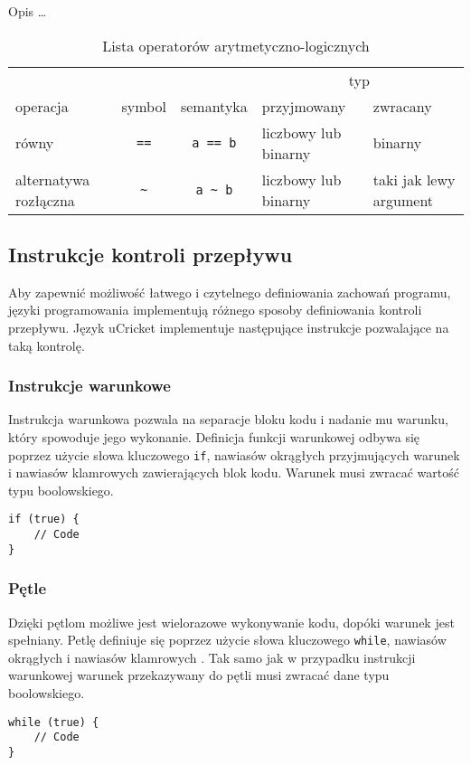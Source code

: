 \begin{table}%
\centering
\caption{Opis …}
\label{tbl:etykieta}
\begin{tabular}{lccp{2.8cm}p{3cm}}
\toprule
         &          &           & \multicolumn{2}{c}{typ} \\
\cmidrule{4-5}
operacja & symbol & semantyka & przyjmowany & zwracany \\ 
\midrule
równy & \lstinline|==|& \lstinline|a == b| & liczbowy lub binarny & binarny\\
alternatywa rozłączna & \lstinline|~| & \lstinline|a ~ b| & liczbowy lub binarny & taki jak lewy argument\\
\bottomrule
\end{tabular}
\caption{Lista operatorów arytmetyczno-logicznych}
\label{tbl:operatory-arytmetyczno-logiczne}
\end{table}


\subsection{Instrukcje kontroli przepływu}
Aby zapewnić możliwość łatwego i czytelnego definiowania zachowań programu, języki programowania implementują różnego sposoby definiowania kontroli przepływu. Język uCricket implementuje następujące instrukcje pozwalające na taką kontrolę.

\subsubsection{Instrukcje warunkowe}
Instrukcja warunkowa pozwala na separacje bloku kodu i nadanie mu warunku, który spowoduje jego wykonanie. Definicja funkcji warunkowej odbywa się poprzez użycie słowa kluczowego \lstinline|if|, nawiasów okrągłych przyjmujących warunek i nawiasów klamrowych zawierających blok kodu. Warunek musi zwracać wartość typu boolowskiego. 
\begin{lstlisting}
if (true) {
	// Code
}
\end{lstlisting}

\subsubsection{Pętle}
Dzięki pętlom możliwe jest wielorazowe wykonywanie kodu, dopóki warunek jest spełniany. Petlę definiuje się poprzez użycie słowa kluczowego \lstinline|while|, nawiasów okrągłych  i nawiasów klamrowych . Tak samo jak w przypadku instrukcji warunkowej  warunek przekazywany do pętli musi zwracać dane typu boolowskiego.
\begin{lstlisting}
while (true) {
	// Code
}
\end{lstlisting}
 
